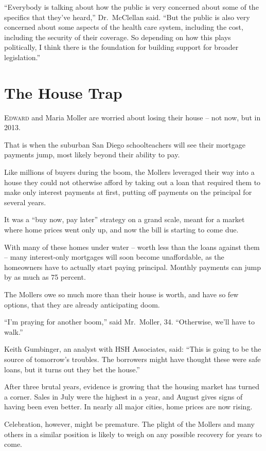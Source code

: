 ﻿\documentclass[12pt]{article}
\begin{document}
``Everybody is talking about how the public is very concerned about some of the specifics that
they've heard,'' Dr.~McClellan said. ``But the public is also very concerned about some aspects of
the health care system, including the cost, including the security of their coverage. So depending
on how this plays politically, I think there is the foundation for building support for broader
legislation.''

\section{The House Trap}

\lettrine{E}{dward} and Maria Moller are worried about losing their house -- not now, but in 2013.

That is when the suburban San Diego schoolteachers will see their mortgage payments jump, most
likely beyond their ability to pay.

Like millions of buyers during the boom, the Mollers leveraged their way into a house they could not
otherwise afford by taking out a loan that required them to make only interest payments at first,
putting off payments on the principal for several years.

It was a ``buy now, pay later'' strategy on a grand scale, meant for a market where home prices went
only up, and now the bill is starting to come due.

With many of these homes under water -- worth less than the loans against them -- many interest-only
mortgages will soon become unaffordable, as the homeowners have to actually start paying principal.
Monthly payments can jump by as much as 75 percent.

The Mollers owe so much more than their house is worth, and have so few options, that they are
already anticipating doom.

``I'm praying for another boom,'' said Mr.~Moller, 34. ``Otherwise, we'll have to walk.''

Keith Gumbinger, an analyst with HSH Associates, said: ``This is going to be the source of
tomorrow's troubles. The borrowers might have thought these were safe loans, but it turns out they
bet the house.''

After three brutal years, evidence is growing that the housing market has turned a corner. Sales in
July were the highest in a year, and August gives signs of having been even better. In nearly all
major cities, home prices are now rising.

Celebration, however, might be premature. The plight of the Mollers and many others in a similar
position is likely to weigh on any possible recovery for years to come.
\end{document}
